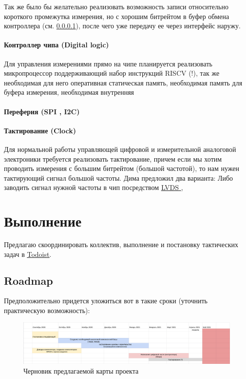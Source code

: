 \documentclass[a4paper,12pt]{article} %
\newcommand{\link}[2]{\underline{\href{#1}{#2} }}
\begin{document}
Так же было бы желательно реализовать возможность записи относительно короткого промежутка измерения, но с хорошим битрейтом в буфер обмена контроллера (см. \ref{digital}), после чего уже передачу ее через интерфейс наружу.

\paragraph{ Контроллер чипа (Digital logic)} \label{digital}

Для управления измерениями прямо на чипе планируется реализовать микропроцессор поддерживающий набор инструкций RISCV (!), так же необходимая для него оперативная статическая память, необходимая память для буфера измерения, необходимая внутренняя 

\paragraph{ Переферия  (SPI , I2C)}

\paragraph{ Тактирование (Clock)}
Для нормальной работы управляющей цифровой и измерительной аналоговой электроники требуется реализовать тактирование, причем если мы хотим проводить измерения с большим битрейтом (большой частотой), то нам нужен тактирующий сигнал большой частоты. Дима предложил два варианта: Либо заводить сигнал нужной частоты в чип посредством \link{https://ru.wikipedia.org/wiki/LVDS}{LVDS}, 


\section{Выполнение}





Предлагаю скоординировать коллектив, выполнение и постановку тактических задач в \underline {\href{todoist.com}{Todoist}}.

\subsection{Roadmap}

Предположительно придется уложиться вот в такие сроки (уточнить практическую возможность):


\begin{figure}[h]
\centering
\includegraphics[width=1.1\textwidth]{roadmap.png}
\caption{ Черновик предлагаемой карты проекта}
\end{figure}
\end{document}
